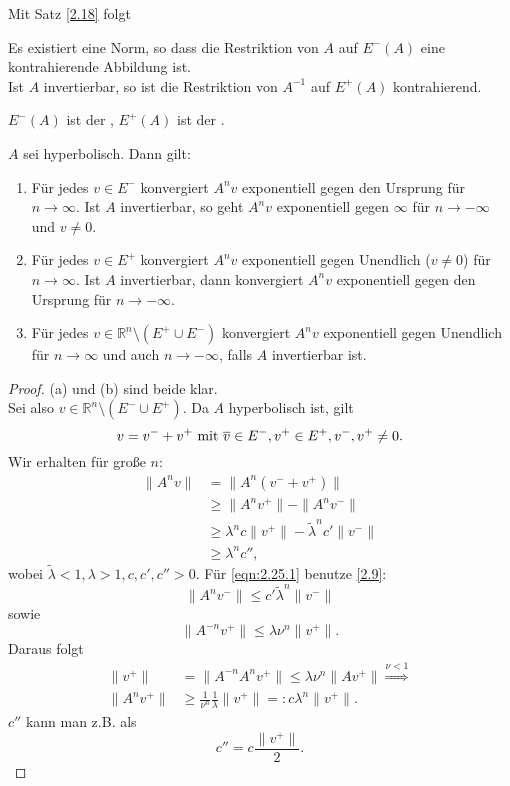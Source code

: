 \documentclass[main.tex]{subfiles}
\begin{document}
Mit Satz \ref{2.18} folgt
\begin{korollar}\label{2.23}
Es existiert eine Norm, so dass die Restriktion von $A$ auf $E^-(A)$ eine kontrahierende Abbildung ist.\\
Ist $A$ invertierbar, so ist die Restriktion von $A^{-1}$ auf $E^+(A)$ kontrahierend.
\end{korollar}

\begin{mydef}\label{2.24}
$E^-(A)$ ist der , $E^+(A)$ ist der .
\end{mydef}

\begin{satz}\label{2.25}
$A$ sei hyperbolisch. Dann gilt:
\begin{enumerate}
[label=(\alph*)]
\item \label{2.25.1} Für jedes $v \in E^-$ konvergiert $A^n v$ exponentiell gegen den Ursprung für $n\to ∞$. Ist $A$ invertierbar, so geht $A^n v$ exponentiell gegen $∞$ für $n\to -∞$ und $v\ne 0$.
\item \label{2.25.2} Für jedes $v\in E^+$ konvergiert $A^n v$ exponentiell gegen Unendlich ($v\ne 0$) für $n\to ∞$. Ist $A$ invertierbar, dann konvergiert $A^n v$ exponentiell gegen den Ursprung für $n\to -∞$.
\item \label{2.25.3} Für jedes $v\in ℝ^n\setminus ( E^+ \cup E^-)$ konvergiert $A^n v$ exponentiell gegen Unendlich für $n\to ∞$ und auch $n\to -∞$, falls $A$ invertierbar ist.
\end{enumerate}
\end{satz}

\begin{proof}
(a) und (b) sind beide klar.\\
Sei also $v\in ℝ^n \setminus (E^- \cup E^+)$. Da $A$ hyperbolisch ist, gilt
$$v = v^- + v^+ \text{ mit } \overline{v} \in E^-, v^+ \in E^+, v^-, v^+ \ne 0.$$
Wir erhalten für große $n$:
\begin{align}
\| A^n v \| &= \| A^n ( v^- + v^+ ) \| \nonumber \\
& \ge \| A^n v^+ \| - \|A^n v^- \|\nonumber \\
& \ge λ^n c \| v^+ \| - \tilde{λ}^n c ' \| v^- \| \label{eqn:2.25.1} \tag{$\star$}\\
& \ge λ^n c'',\nonumber
\end{align}
wobei $\tilde λ < 1 , λ > 1, c,c', c'' > 0$. 
Für \eqref{eqn:2.25.1} benutze \ref{2.9}:
$$\| A^n v^- \| \le c' \tilde λ^n \| v^- \|$$
sowie
$$\|A^{-n}v^+\| \le λ ν^n \| v^+ \|.$$
Daraus folgt
\begin{align*}
\|v^+ \| &= \| A^{-n} A^n v^+ \| \le λν^n \| A v^+ \| \stackrel{ν<1}\Rightarrow \\
\|A^n v^+ \| &\ge \frac{1}{ν^n} \frac{1}{λ} \| v^+ \| = : cλ^n \| v^+ \|.
\end{align*}
$c''$ kann man z.B. als 
$$c'' = c\frac{ \| v^+  \|}{2}.$$
\end{proof}
\end{document}
